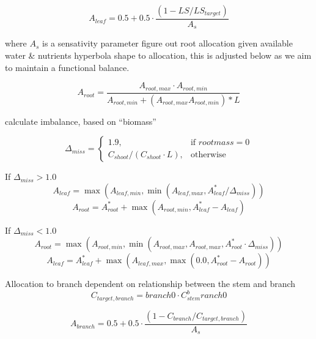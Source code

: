 \begin{equation}
	A_{leaf} = 0.5 + 0.5 \cdot \dfrac{(1-LS/LS_{target})}{A_{s}}
	\label{AleafAllometric}
\end{equation}

where $A_{s}$ is a sensativity parameter figure out root allocation given available water \& nutrients hyperbola shape to allocation, this is adjusted below as we aim to maintain a functional balance.

\begin{equation}
	A_{root} = \dfrac{A_{root,max} \cdot A_{root,min}}{A_{root,min} + (A_{root,max} A_{root,min})*L}
\end{equation}

calculate imbalance, based on ``biomass''

\begin{equation}
	\Delta_{miss}=
	\begin{cases}
	    1.9,& \text{if } root mass = 0 \\
	    C_{shoot}/(C_{shoot} \cdot L),& \text{otherwise}
	\end{cases}
\end{equation}

If $\Delta_{miss} > 1.0$ 
\begin{equation}
	A_{leaf} = \max (A_{leaf,min}, \min (A_{leaf,max}, A_{leaf}^* / \Delta_{miss}))
\end{equation}
\begin{equation}
	A_{root} = A_{root}^* + \max (A_{root,min}, A_{leaf}^* - A_{leaf})
\end{equation}

If $\Delta_{miss} < 1.0$ 
\begin{equation}
	A_{root} = \max (A_{root,min}, \min (A_{root,max},A_{root,max}, A_{root}^* \cdot \Delta_{miss}))
\end{equation}
\begin{equation}
	A_{leaf} = A_{leaf}^* + \max (A_{leaf,max}, \max(0.0, A_{root}^* - A_{root}))
\end{equation}


Allocation to branch dependent on relationship between the stem and branch
\begin{equation}
	C_{target,branch} = branch0 \cdot C_{stem}^branch0
\end{equation}

\begin{equation}
	A_{branch} = 0.5 + 0.5 \cdot \dfrac{(1-C_{branch}/C_{target,branch})}{A_{s}}
\end{equation}

